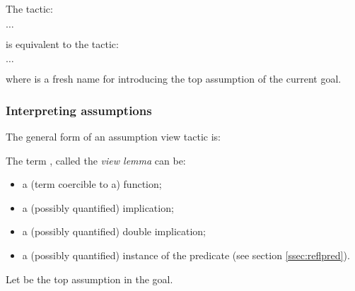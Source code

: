 The \ssr{}
tactic:

    $\dots$ \ssrC{)}

\noindent
is equivalent to the tactic:

    $\dots$ 

\noindent
where  is a fresh name for introducing the top assumption of
the current goal.

\subsubsection*{Interpreting assumptions}
\label{sssec:hypview}
The general form of an assumption view tactic is:

\begin{center}
  \ssrC{/} 
\end{center}

The term , called the \emph{view lemma} can be:
\begin{itemize}
\item a (term coercible to a) function;
\item a (possibly quantified) implication;
\item a (possibly quantified) double implication;
\item a (possibly quantified) instance of the  predicate
  (see section \ref{ssec:reflpred}).
\end{itemize}

Let  be the top assumption in the goal.


